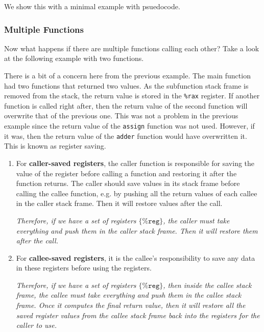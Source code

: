       \begin{example}
        We show this with a minimal example with psuedocode. 
      \end{example}

    \subsubsection{Multiple Functions}

      Now what happens if there are multiple functions calling each other? Take a look at the following example with two functions. 

      \begin{example}
        
      \end{example}

      There is a bit of a concern here from the previous example. The main function had two functions that returned two values. As the subfunction stack frame is removed from the stack, the return value is stored in the \texttt{\%rax} register. If another function is called right after, then the return value of the second function will overwrite that of the previous one. This was not a problem in the previous example since the return value of the \texttt{assign} function was not used. However, if it was, then the return value of the \texttt{adder} function would have overwritten it. This is known as register saving. 
      \begin{enumerate}
        \item For \textbf{caller-saved registers}, the caller function is responsible for saving the value of the register before calling a function and restoring it after the function returns. The caller should save values in its stack frame before calling the callee function, e.g. by pushing all the return values of each callee in the caller stack frame. Then it will restore values after the call. 

        \begin{center}
          \textit{Therefore, if we have a set of registers $\{\texttt{\%reg}\}$, the caller must take everything and push them in the caller stack frame. Then it will restore them after the call.}
        \end{center}

        \item For \textbf{callee-saved registers}, it is the callee's responsibility to save any data in these registers before using the registers. 

          \begin{center} 
            \textit{Therefore, if we have a set of registers $\{\texttt{\%reg}\}$, then inside the callee stack frame, the callee must take everything and push them in the callee stack frame. Once it computes the final return value, then it will restore all the saved register values from the callee stack frame back into the registers for the caller to use.}
          \end{center}
      \end{enumerate}

